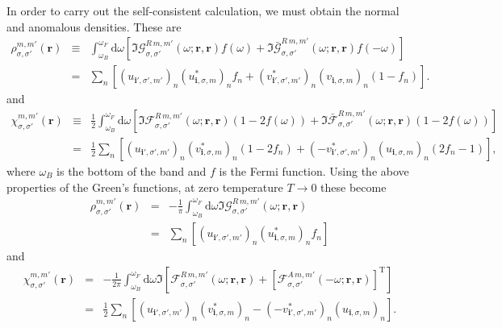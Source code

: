 In order to carry out the self-consistent calculation, we must obtain the normal and anomalous densities. These are
\begin{eqnarray}
\rho_{\sigma,\sigma'}^{m,m'}\left(\mathbf{r}\right)
&\equiv&    
\int^{\omega_F}_{\omega_B}\text{d}\omega
\left[
 \Im{\mathcal{G}}_{\sigma,\sigma'}^{R\,m,m'}\left(\omega; \mathbf{r}, \mathbf{r}\right)f(\omega)
 +
  \Im{\bar{\mathcal{G}}}_{\sigma,\sigma'}^{R\,m,m'}\left(\omega; \mathbf{r}, \mathbf{r}\right)f(-\omega)
  \right]\\
&=&
\sum_n
\left[
(u_{\mathbf{i}',\sigma',m'})_n
(u^*_{\mathbf{i},\sigma,m})_n
f_n
+
(v^*_{\mathbf{i}',\sigma',m'})_n
(v_{\mathbf{i},\sigma,m})_n
(1-f_n)
\right].
\end{eqnarray}
and
\begin{eqnarray}
\chi_{\sigma,\sigma'}^{m,m'}\left(\mathbf{r}\right)
&\equiv&
\frac{1}{2}
\int^{\omega_F}_{\omega_B}\text{d}\omega
\left[
 \Im{\mathcal{F}}_{\sigma,\sigma'}^{R\,m,m'}\left(\omega; \mathbf{r}, \mathbf{r}\right)(1-2f(\omega))
 +
  \Im{\bar{\mathcal{F}}}_{\sigma,\sigma'}^{R\,m,m'}\left(\omega; \mathbf{r}, \mathbf{r}\right)(1-2f(\omega))
  \right]\\
&=&
\frac{1}{2}
\sum_n
\left[
(u_{\mathbf{i}',\sigma',m'})_n
(v^*_{\mathbf{i},\sigma,m})_n
(1-2f_n)
+
(-v^*_{\mathbf{i}',\sigma',m'})_n
(u_{\mathbf{i},\sigma,m})_n
(2f_n-1)
\right],
\end{eqnarray}
where $\omega_B$ is the bottom of the band and $f$ is the Fermi function. Using the above properties of the Green's functions, at zero temperature $T\rightarrow0$ these become
\begin{eqnarray}
\rho_{\sigma,\sigma'}^{m,m'}\left(\mathbf{r}\right)
&=&
-\frac{1}{\pi}\int^{\omega_F}_{\omega_B}\text{d}\omega
 \Im{\mathcal{G}}_{\sigma,\sigma'}^{R\,m,m'}\left(\omega; \mathbf{r}, \mathbf{r}\right)
\\
&=&
\sum_n
\left[
(u_{\mathbf{i}',\sigma',m'})_n
(u^*_{\mathbf{i},\sigma,m})_n
f_n
\right]
\end{eqnarray}
and
\begin{eqnarray}
\chi_{\sigma,\sigma'}^{m,m'}\left(\mathbf{r}\right)
&=&
-\frac{1}{2\pi}\int^{\omega_F}_{\omega_B}\text{d}\omega
\Im
\left[
 \mathcal{F}_{\sigma,\sigma'}^{R\,m,m'}\left(\omega; \mathbf{r}, \mathbf{r}\right)
 +
  \left[\mathcal{F}_{\sigma,\sigma'}^{A\,m,m'}\left(-\omega; \mathbf{r}, \mathbf{r}\right)\right]^\text{T}
  \right]
\\
&=&
\frac{1}{2}
\sum_n
\left[
(u_{\mathbf{i}',\sigma',m'})_n
(v^*_{\mathbf{i},\sigma,m})_n
-
(-v^*_{\mathbf{i}',\sigma',m'})_n
(u_{\mathbf{i},\sigma,m})_n
\right].
\end{eqnarray}

